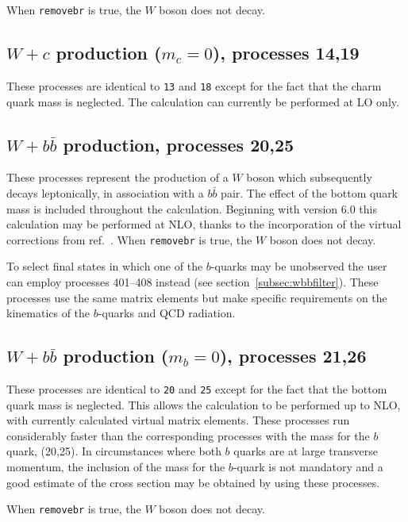 \documentclass[12pt]{article}
\begin{document}
When {\tt removebr} is true, the $W$ boson does not decay.

\subsection{$W+c$ production ($m_c=0$), processes 14,19}
\label{subsec:wcmassless}

These processes are identical to {\tt 13} and {\tt 18} except for the fact
that the charm quark mass is neglected. The calculation can currently be
performed at LO only.

\subsection{$W+b{\bar b}$ production, processes 20,25}
\label{subsec:wbb}

These processes represent the production of a $W$ boson which subsequently
decays leptonically, in association with a $b{\bar b}$ pair. The effect of
the bottom quark mass is included throughout the calculation.  
Beginning with \MCFM version 6.0 this calculation may be performed at NLO, thanks to
the incorporation of the virtual corrections from ref.~\cite{Badger:2010mg}.
When {\tt removebr} is true, the $W$ boson does not decay.

To select final states in which one of the $b$-quarks may be unobserved the
user can employ processes 401--408 instead (see section~\ref{subsec:wbbfilter}).
These processes use the same matrix
elements but make specific requirements on the kinematics of the $b$-quarks
and QCD radiation. 

\subsection{$W+b{\bar b}$ production ($m_b=0$), processes 21,26}
\label{subsec:wbbmassless}

These processes are identical to {\tt 20} and {\tt 25} except for the fact
that the bottom quark mass is neglected. This allows the calculation to be
performed up to NLO, with currently calculated virtual matrix elements. These 
processes run considerably faster than the corresponding processes with the mass
for the $b$ quark, (20,25). In circumstances where both $b$ quarks are at large 
transverse momentum, the inclusion of the mass for the $b$-quark is not mandatory
and a good estimate of the cross section may be obtained by using these processes.

When {\tt removebr} is true, the $W$ boson does not decay.
\end{document}
